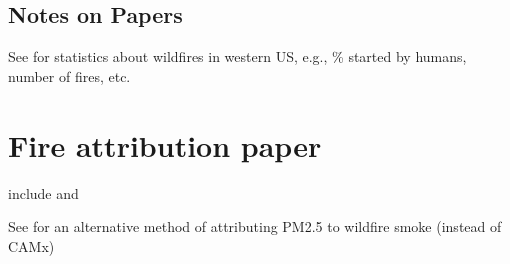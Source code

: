 \subsection{Notes on Papers}

See \cite{Fusco2016} for statistics about wildfires in western US, e.g., \% started by humans, number of fires, etc.

\section{Fire attribution paper}

include \cite{westerling_increasing_2016,WesterlingCorrection2016} and \cite{abatzoglou_impact_2016}

See \cite{Kaulfus2017} for an alternative method of attributing PM2.5 to wildfire smoke (instead of CAMx)